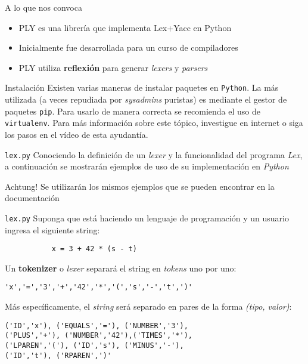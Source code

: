 \documentclass[pdf]{beamer}
\begin{document}
	\begin{frame}{A lo que nos convoca}
		\begin{itemize}
			\item PLY es una librería que implementa Lex+Yacc en Python
			\item Inicialmente fue desarrollada para un curso de compiladores
			\item PLY utiliza \textbf{reflexión} para generar \emph{lexers} y \emph{parsers}
		\end{itemize}
	\end{frame}
	
	\begin{frame}{Instalación}
		Existen varias maneras de instalar paquetes en \texttt{Python}. La más utilizada (a veces repudiada por \emph{sysadmins} puristas) es mediante el gestor de paquetes \texttt{pip}. Para usarlo de manera correcta se recomienda el uso de \texttt{virtualenv}. Para más información sobre este tópico, investigue en internet o siga los pasos en el vídeo de esta ayudantía.
	\end{frame}
	
	\begin{frame}{\texttt{lex.py}}
		Conociendo la definición de un \emph{lexer} y la funcionalidad del programa \emph{Lex}, a continuación se mostrarán ejemplos de uso de su implementación en \emph{Python}
		
		\begin{alertblock}{Achtung!}
		Se utilizarán los mismos ejemplos que se pueden encontrar en la documentación	
		\end{alertblock}
	\end{frame}
	
\begin{frame}[fragile]{\texttt{lex.py}}
Suponga que está haciendo un lenguaje de programación y un usuario ingresa el siguiente string:

\begin{lstlisting}
           x = 3 + 42 * (s - t)
\end{lstlisting}

Un \textbf{tokenizer} o \emph{lexer} separará el string en \emph{tokens} uno por uno:

\begin{lstlisting}
'x','=','3','+','42','*','(','s','-','t',')'
\end{lstlisting}

Más específicamente, el \emph{string} será separado en pares de la forma \emph{(tipo, valor)}:

\begin{lstlisting}
('ID','x'), ('EQUALS','='), ('NUMBER','3'), 
('PLUS','+'), ('NUMBER','42'),('TIMES','*'),
('LPAREN','('), ('ID','s'), ('MINUS','-'),
('ID','t'), ('RPAREN',')'
\end{lstlisting}

\end{frame}
	
\end{document}

